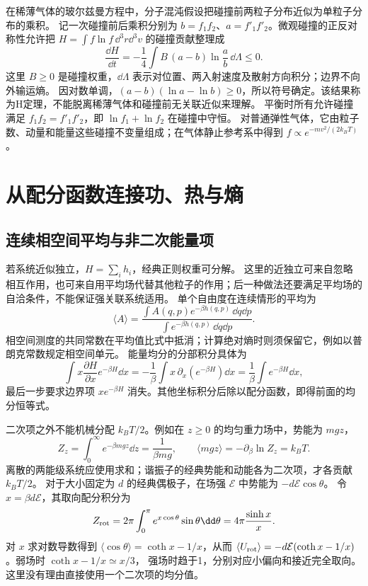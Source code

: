 在稀薄气体的玻尔兹曼方程中，分子混沌假设把碰撞前两粒子分布近似为单粒子分布的乘积。
记一次碰撞前后乘积分别为 $b=f_1f_2$、$a=f'_1f'_2$。微观碰撞的正反对称性允许把
$H=\int f\ln f\,\dd^3r\dd^3v$ 的碰撞贡献整理成
\[\frac{\dd H}{\dd t}=-\frac14\int B\,(a-b)\ln\frac ab\,\dd\Lambda\le0.\]
这里 $B\ge0$ 是碰撞权重，$\dd\Lambda$ 表示对位置、两入射速度及散射方向积分；边界不向外输运熵。
因对数单调，$(a-b)(\ln a-\ln b)\ge0$，所以符号确定。该结果称为H定理，不能脱离稀薄气体和碰撞前无关联近似来理解。
平衡时所有允许碰撞满足 $f_1f_2=f'_1f'_2$，即 $\ln f_1+\ln f_2$ 在碰撞中守恒。
对普通弹性气体，它由粒子数、动量和能量这些碰撞不变量组成；在气体静止参考系中得到 $f\propto e^{-mv^2/(2k_BT)}$。

\section{从配分函数连接功、热与熵}

\subsection{连续相空间平均与非二次能量项}

若系统近似独立，$H=\sum_ih_i$，经典正则权重可分解。
这里的近独立可来自忽略相互作用，也可来自用平均场代替其他粒子的作用；后一种做法还要满足平均场的自洽条件，不能保证强关联系统适用。
单个自由度在连续情形的平均为
\[\langle A\rangle=
\frac{\int A(q,p)e^{-\beta h(q,p)}\,\dd q\dd p}
{\int e^{-\beta h(q,p)}\,\dd q\dd p}.\]
相空间测度的共同常数在平均值比式中抵消；计算绝对熵时则须保留它，例如以普朗克常数规定相空间单元。
能量均分的分部积分具体为
\[\int x\frac{\partial H}{\partial x}e^{-\beta H}\dd x
=-\frac1\beta\int x\,\partial_x(e^{-\beta H})\dd x
=\frac1\beta\int e^{-\beta H}\dd x,\]
最后一步要求边界项 $xe^{-\beta H}$ 消失。其他坐标积分后除以配分函数，即得前面的均分恒等式。

二次项之外不能机械分配 $k_BT/2$。例如在 $z\ge0$ 的均匀重力场中，势能为 $mgz$，
\[Z_z=\int_0^\infty e^{-\beta mgz}\dd z=\frac1{\beta mg},
\qquad \langle mgz\rangle=-\partial_\beta\ln Z_z=k_BT.\]
离散的两能级系统应使用求和；谐振子的经典势能和动能各为二次项，才各贡献 $k_BT/2$。
对于大小固定为 $d$ 的经典偶极子，在场强 $\mathcal E$ 中势能为 $-d\mathcal E\cos\theta$。
令 $x=\beta d\mathcal E$，其取向配分积分为
\[Z_{\rm rot}=2\pi\int_0^\pi e^{x\cos\theta}\sin\theta\dd\theta
=4\pi\frac{\sinh x}{x}.\]
对 $x$ 求对数导数得到 $\langle\cos\theta\rangle=\coth x-1/x$，从而
$\langle U_{\rm rot}\rangle=-d\mathcal E(\coth x-1/x)$。弱场时 $\coth x-1/x\simeq x/3$，
强场时趋于1，分别对应小偏向和接近完全取向。这里没有理由直接使用一个二次项的均分值。

